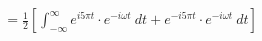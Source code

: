 \documentclass[preview]{standalone}
\begin{document}
\begin{align*}
&=\frac{1}{2}\left[ \int_{-\infty}^{\infty}e^{i5\pi t}\cdot e^{-i\omega t} \ dt+e^{-i5\pi t}\cdot e^{-i\omega t} \ dt \right] \\
\end{align*}
\end{document}
